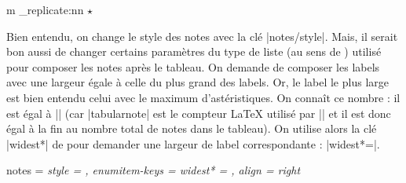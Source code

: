 \documentclass[dvipsnames]{article}%
\begin{document}
\medskip
\begin{Code}
\ExplSyntaxOn
\NewDocumentCommand { \emph{\stars} } { m }
  { \prg_replicate:nn { \value { #1 } } { \( \star \) } }
\ExplSyntaxOff
\end{Code}

\medskip
Bien entendu, on change le style des notes avec la clé |notes/style|. Mais, il
serait bon aussi de changer certains paramètres du type de liste (au sens de
) utilisé pour composer les notes après le tableau. On demande de
composer les labels avec une largeur égale à celle du plus grand des labels. Or,
le label le plus large est bien entendu celui avec le maximum d'astéristiques.
On connaît ce nombre : il est égal à |\value{tabularnote}| (car |tabularnote|
est le compteur LaTeX utilisé par |\tabularnote| et il est donc égal à la fin au
nombre total de notes dans le tableau). On utilise alors la clé |widest*| de
 pour demander une largeur de label correspondante :
|widest*=\value{tabularnote}|.

\smallskip
\begin{Code}
\NiceMatrixOptions
  {
    notes =
     {
       \emph{style =  , 
       enumitem-keys = 
        { 
          widest* = \value{tabularnote} ,
          align = right 
        } }
     }
  }
\end{Code}
\end{document}
